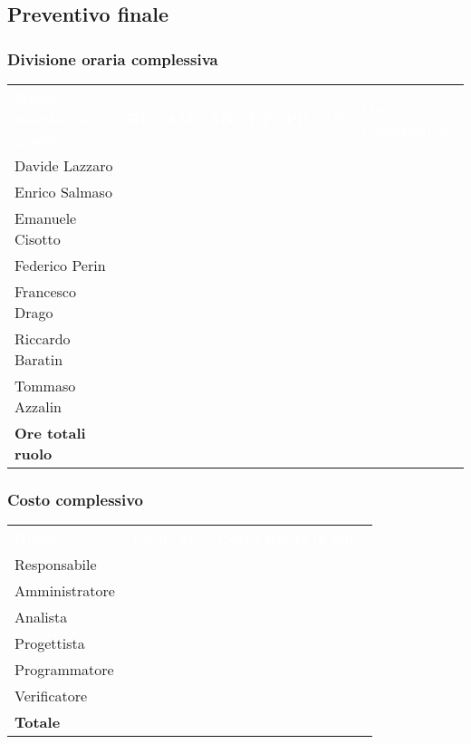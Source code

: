 \subsection{Preventivo finale}
\subsubsection{Divisione oraria complessiva}
{
	\renewcommand{\arraystretch}{2}
	\centering
	\begin{longtable}{ C{5cm} C{1cm} C{1cm} C{1cm} C{1cm} C{1cm} C{1cm} C{3cm}}
		\textcolor{white}{\textbf{Nome membro del gruppo}} & \textcolor{white}{\textbf{RE}} & \textcolor{white}{\textbf{AM}} & \textcolor{white}{\textbf{AN}} & \textcolor{white}{\textbf{PT}} & \textcolor{white}{\textbf{PR}} & \textcolor{white}{\textbf{VE}} & \textcolor{white}{\textbf{Ore complessive}}\\	
        
        Davide Lazzaro & & & & & & & \\
        Enrico Salmaso & & & & & & & \\
        Emanuele Cisotto & & & & & & & \\
        Federico Perin & & & & & & & \\
        Francesco Drago & & & & & & & \\
        Riccardo Baratin & & & & & & & \\
        Tommaso Azzalin & & & & & & & \\
        \textbf{Ore totali ruolo} & & & & & & & \\
		
	\end{longtable}
}
\subsubsection{Costo complessivo}
{
	\renewcommand{\arraystretch}{2}
	\centering
	\begin{longtable}{ C{3cm} C{2cm} C{4cm}}
		\textcolor{white}{\textbf{Ruolo}} & \textcolor{white}{\textbf{Totale ore}} & \textcolor{white}{\textbf{Costo Ruolo in euro}}\\	
        
        Responsabile & & \\
        Amministratore & & \\
        Analista & & \\
        Progettista & & \\
        Programmatore & & \\
        Verificatore & & \\
        \textbf{Totale} & & \\
		
	\end{longtable}
}


